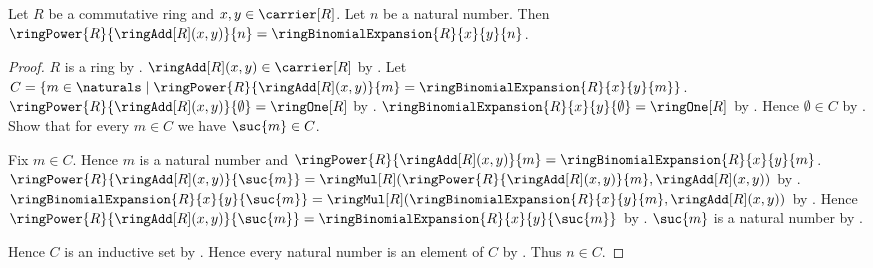 \begin{theorem}\label{ring_binomial_theorem}
    Let $R$ be a commutative ring and $x,y\in\carrier[R]$.
    Let $n$ be a natural number.
    Then
        $\ringPower{R}{\ringAdd[R](x,y)}{n}
            =\ringBinomialExpansion{R}{x}{y}{n}$.
\end{theorem}
\begin{proof}
    $R$ is a ring by .
    $\ringAdd[R](x,y)\in\carrier[R]$ by .
    Let $C=\{m\in\naturals\mid
        \ringPower{R}{\ringAdd[R](x,y)}{m}
            =\ringBinomialExpansion{R}{x}{y}{m}\}$.
    $\ringPower{R}{\ringAdd[R](x,y)}{\emptyset}
        =\ringOne[R]$ by .
    $\ringBinomialExpansion{R}{x}{y}{\emptyset}
        =\ringOne[R]$ by
        .
    Hence $\emptyset\in C$ by .
    Show that for every $m\in C$ we have $\suc{m}\in C$.
    \begin{subproof}
        Fix $m\in C$.
        Hence $m$ is a natural number and
            $\ringPower{R}{\ringAdd[R](x,y)}{m}
                =\ringBinomialExpansion{R}{x}{y}{m}$.
        $\ringPower{R}{\ringAdd[R](x,y)}{\suc{m}}
            =\ringMul[R](
                \ringPower{R}{\ringAdd[R](x,y)}{m},
                \ringAdd[R](x,y))$ by
            .
        $\ringBinomialExpansion{R}{x}{y}{\suc{m}}
            =\ringMul[R](
                \ringBinomialExpansion{R}{x}{y}{m},
                \ringAdd[R](x,y))$ by
            .
        Hence
            $\ringPower{R}{\ringAdd[R](x,y)}{\suc{m}}
                =\ringBinomialExpansion{R}{x}{y}{\suc{m}}$ by
            \auto.
        $\suc{m}$ is a natural number by .
    \end{subproof}
    Hence $C$ is an inductive set by .
    Hence every natural number is an element of $C$ by
        .
    Thus $n\in C$.
\end{proof}
